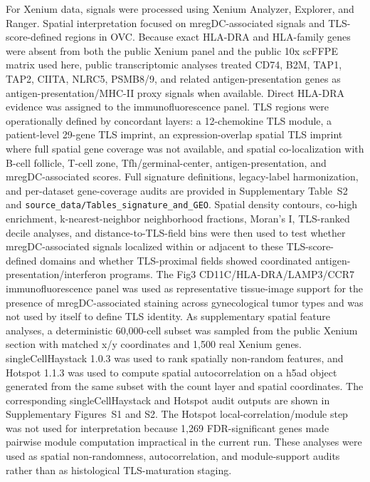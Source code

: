 \documentclass[cancers,article,submit,pdftex,moreauthors]{Definitions/mdpi}
\begin{document}
For Xenium data, signals were processed using Xenium Analyzer, Explorer, and Ranger. Spatial interpretation focused on mregDC-associated signals and TLS-score-defined regions in OVC. Because exact HLA-DRA and HLA-family genes were absent from both the public Xenium panel and the public 10x scFFPE matrix used here, public transcriptomic analyses treated CD74, B2M, TAP1, TAP2, CIITA, NLRC5, PSMB8/9, and related antigen-presentation genes as antigen-presentation/MHC-II proxy signals when available. Direct HLA-DRA evidence was assigned to the immunofluorescence panel. TLS regions were operationally defined by concordant layers: a 12-chemokine TLS module, a patient-level 29-gene TLS imprint, an expression-overlap spatial TLS imprint where full spatial gene coverage was not available, and spatial co-localization with B-cell follicle, T-cell zone, Tfh/germinal-center, antigen-presentation, and mregDC-associated scores. Full signature definitions, legacy-label harmonization, and per-dataset gene-coverage audits are provided in Supplementary Table~S2 and \texttt{source\_data/Tables\_signature\_and\_GEO}. Spatial density contours, co-high enrichment, k-nearest-neighbor neighborhood fractions, Moran's I, TLS-ranked decile analyses, and distance-to-TLS-field bins were then used to test whether mregDC-associated signals localized within or adjacent to these TLS-score-defined domains and whether TLS-proximal fields showed coordinated antigen-presentation/interferon programs. The Fig3 CD11C/HLA-DRA/LAMP3/CCR7 immunofluorescence panel was used as representative tissue-image support for the presence of mregDC-associated staining across gynecological tumor types and was not used by itself to define TLS identity. As supplementary spatial feature analyses, a deterministic 60,000-cell subset was sampled from the public Xenium section with matched x/y coordinates and 1,500 real Xenium genes. singleCellHaystack 1.0.3 was used to rank spatially non-random features, and Hotspot 1.1.3 was used to compute spatial autocorrelation on a h5ad object generated from the same subset with the count layer and spatial coordinates. The corresponding singleCellHaystack and Hotspot audit outputs are shown in Supplementary Figures~S1 and S2. The Hotspot local-correlation/module step was not used for interpretation because 1,269 FDR-significant genes made pairwise module computation impractical in the current run. These analyses were used as spatial non-randomness, autocorrelation, and module-support audits rather than as histological TLS-maturation staging.
\end{document}
